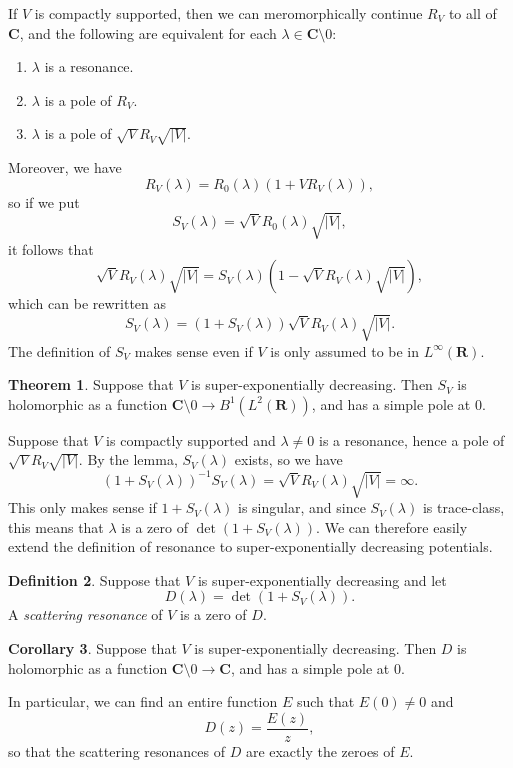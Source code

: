 \documentclass[12pt]{report}
\newcommand{\RR}{\mathbf{R}}
\newcommand{\CC}{\mathbf{C}}
\newcommand{\dfn}[1]{\emph{#1}\index{#1}}
\theoremstyle{definition}
\newtheorem{theorem}{Theorem}[chapter]
\newtheorem{corollary}[theorem]{Corollary}
\newtheorem{definition}[theorem]{Definition}
\begin{document}
If $V$ is compactly supported, then we can meromorphically continue $R_V$ to all of $\CC$, and the following are equivalent for each $\lambda \in \CC \setminus 0$:
\begin{enumerate}
\item $\lambda$ is a resonance.
\item $\lambda$ is a pole of $R_V$.
\item $\lambda$ is a pole of $\sqrt VR_V\sqrt{|V|}$.
\end{enumerate}
Moreover, we have
$$R_V(\lambda) = R_0(\lambda)(1 + VR_V(\lambda)),$$
so if we put
$$S_V(\lambda) = \sqrt VR_0(\lambda) \sqrt{|V|},$$
it follows that
$$\sqrt V R_V(\lambda) \sqrt{|V|} = S_V(\lambda)(1 - \sqrt VR_V(\lambda)\sqrt{|V|}),$$
which can be rewritten as
$$S_V(\lambda) = (1 + S_V(\lambda))\sqrt V R_V(\lambda)\sqrt{|V|}.$$
The definition of $S_V$ makes sense even if $V$ is only assumed to be in $L^\infty(\RR)$.
\begin{theorem}
  \label{sv is b1 family}
Suppose that $V$ is super-exponentially decreasing. Then $S_V$ is holomorphic as a function $\CC \setminus 0 \to B^1(L^2(\RR))$, and has a simple pole at $0$.
\end{theorem}
Suppose that $V$ is compactly supported and $\lambda \neq 0$ is a resonance, hence a pole of $\sqrt VR_V\sqrt{|V|}$. By the lemma, $S_V(\lambda)$ exists, so we have
$$(1 + S_V(\lambda))^{-1}S_V(\lambda) = \sqrt V R_V(\lambda) \sqrt{|V|} = \infty.$$
This only makes sense if $1 + S_V(\lambda)$ is singular, and since $S_V(\lambda)$ is trace-class, this means that $\lambda$ is a zero of $\det(1 + S_V(\lambda))$.
We can therefore easily extend the definition of resonance to super-exponentially decreasing potentials.
\begin{definition}
Suppose that $V$ is super-exponentially decreasing and let
$$D(\lambda) = \det(1 + S_V(\lambda)).$$
A \dfn{scattering resonance} of $V$ is a zero of $D$.
\end{definition}
\begin{corollary}
Suppose that $V$ is super-exponentially decreasing. Then $D$ is holomorphic as a function $\CC \setminus 0 \to \CC$, and has a simple pole at $0$.
\end{corollary}
In particular, we can find an entire function $E$ such that $E(0) \neq 0$ and
\begin{equation}
  \label{determinant is an entire function}
  D(z) = \frac{E(z)}{z},
\end{equation}
so that the scattering resonances of $D$ are exactly the zeroes of $E$.
\end{document}
